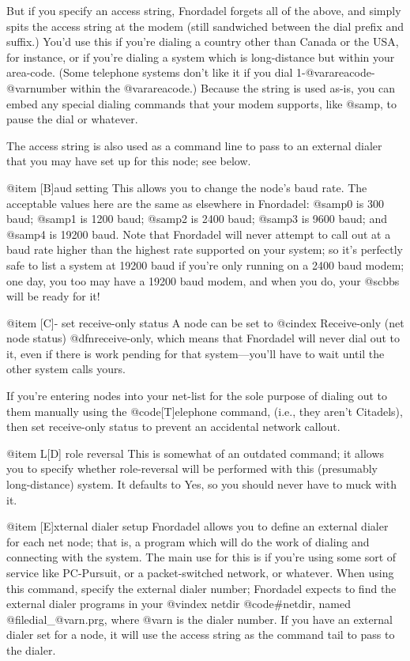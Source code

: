 But if you specify an access string, Fnordadel forgets
all of the above, and simply spits the access string at the modem
(still sandwiched between the dial prefix and suffix.)  You'd use
this if you're dialing a country other than Canada or the USA, for
instance, or if you're dialing a system which is long-distance but
within your area-code. (Some telephone systems don't like it if you
dial 1-@var{areacode}-@var{number} within the @var{areacode}.)  Because the
string is used as-is, you can embed any special dialing commands
that your modem supports, like @samp{,} to pause the dial or whatever.

The access string is also used as a command line to pass
to an external dialer that you may have set up for this node; see below.

@item [B]aud setting
This allows you to change the node's baud rate.  The
acceptable values here are the same as elsewhere in Fnordadel:
@samp{0} is 300 baud; @samp{1} is 1200 baud; @samp{2} is 2400 baud;
@samp{3} is 9600 baud;
and @samp{4} is 19200 baud.  Note that Fnordadel will never attempt
to call out at a baud rate higher than the highest rate supported
on your system; so it's perfectly safe to list a system at 19200
baud if you're only running on a 2400 baud modem; one day, you
too may have a 19200 baud modem, and when you do, your @sc{bbs} will
be ready for it!

@item [C]- set receive-only status
A node can be set to
@cindex Receive-only (net node status)
@dfn{receive-only}, which means that
Fnordadel will never dial out to it, even if there is work
pending for that system---you'll have to wait until the other
system calls yours.

If you're entering nodes into your net-list for the sole
purpose of dialing out to them manually using the @code{[T]elephone} command,
(i.e., they aren't Citadels), then set receive-only status to prevent an
accidental network callout.

@item L[D] role reversal
This is somewhat of an outdated command; it allows you
to specify whether role-reversal will be performed with this
(presumably long-distance) system.  It defaults to Yes, so you
should never have to muck with it.

@item [E]xternal dialer setup
Fnordadel allows you to define an external dialer for
each net node; that is, a program which will do the work of
dialing and connecting with the system.  The main use for this
is if you're using some sort of service like PC-Pursuit, or a
packet-switched network, or whatever.  When using this command,
specify the external dialer number; Fnordadel expects to find
the external dialer programs in your
@vindex netdir
@code{#netdir}, named
@file{dial_@var{n}.prg},
where @var{n} is the dialer number.  If you have an external dialer
set for a node, it will use the access string as
the command tail to pass to the dialer.

